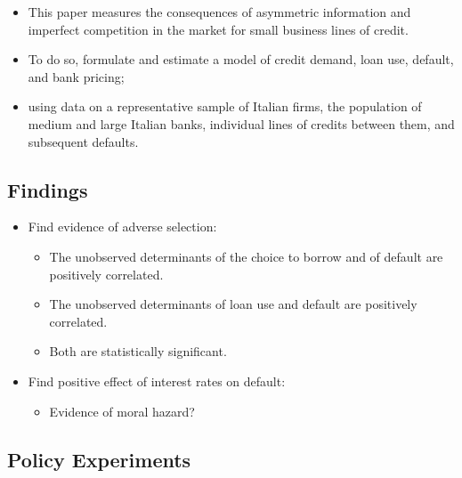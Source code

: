 \documentclass[
]{book}
\providecommand{\tightlist}{%
  \setlength{\itemsep}{0pt}\setlength{\parskip}{0pt}}
\begin{document}
\begin{itemize}
\tightlist
\item
  This paper measures the consequences of asymmetric information and imperfect competition in the market for small business lines of credit.
\item
  To do so, formulate and estimate a model of credit demand, loan use, default, and bank pricing;
\item
  using data on a representative sample of Italian firms, the population of medium and large Italian banks, individual lines of credits between them, and subsequent defaults.
\end{itemize}

\hypertarget{findings}{%
\subsection{Findings}\label{findings}}

\begin{itemize}
\tightlist
\item
  Find evidence of adverse selection:

  \begin{itemize}
  \tightlist
  \item
    The unobserved determinants of the choice to borrow and of default are positively correlated.
  \item
    The unobserved determinants of loan use and default are positively correlated.
  \item
    Both are statistically significant.
  \end{itemize}
\item
  Find positive effect of interest rates on default:

  \begin{itemize}
  \tightlist
  \item
    Evidence of moral hazard?
  \end{itemize}
\end{itemize}

\hypertarget{policy-experiments}{%
\subsection{Policy Experiments}\label{policy-experiments}}
\end{document}
